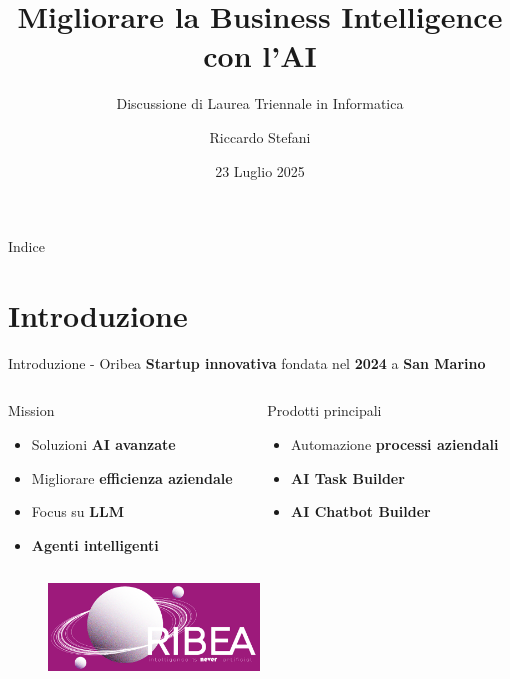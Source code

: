 \documentclass{beamer}
\title{Migliorare la Business Intelligence con l'AI}
\subtitle{Discussione di Laurea Triennale in Informatica}
\author{Riccardo Stefani}
\date{23 Luglio 2025}
\begin{document}
	\maketitle

	\begin{frame}{Indice}
		\tableofcontents
	\end{frame}


	\section{Introduzione}

	\begin{frame}{Introduzione - Oribea}
		\textbf{Startup innovativa} fondata nel \textbf{2024} a \textbf{San Marino}

		\begin{columns}
			\begin{column}{0.5\textwidth}
				\begin{block}{Mission}
					\begin{itemize}
						\item Soluzioni \textbf{AI avanzate}
						\item Migliorare \textbf{efficienza aziendale}
						\item Focus su \textbf{LLM}
						\item \textbf{Agenti intelligenti}
					\end{itemize}
				\end{block}
			\end{column}
			\begin{column}{0.5\textwidth}
				\begin{block}{Prodotti principali}
					\begin{itemize}
						\item Automazione \textbf{processi aziendali}
						\item \textbf{AI Task Builder}
						\item \textbf{AI Chatbot Builder}
					\end{itemize}
				\end{block}
			\end{column}
		\end{columns}

		\begin{figure}[h]
			\centering
			\includegraphics[width=0.5\textwidth]{oribea-logo.png}
		\end{figure}
	\end{frame}
\end{document}
